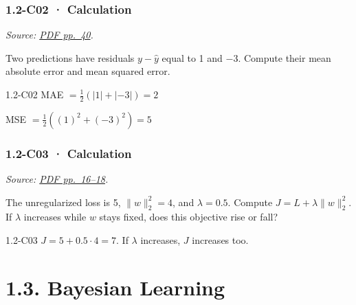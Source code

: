 \noindent\begin{minipage}{\linewidth}

\subsubsection{1.2-C02 · Calculation}\label{c02-calculation-1}

\emph{Source:
\href{../Lecture\%20Slides/1.2.\%20Shallow\%20Learning.pdf\#page=40}{PDF
pp.~40}.}

Two predictions have residuals \(y-\hat y\) equal to 1 and \(-3\).
Compute their mean absolute error and mean squared error.

\begin{solution}[26mm]{1.2-C02}
MAE $= \frac{1}{2}(|1| + |-3|) = 2$

MSE $= \frac{1}{2}((1)^2 + (-3)^2) = 5$
\end{solution}
\end{minipage}\par\medskip

\noindent\begin{minipage}{\linewidth}

\subsubsection{1.2-C03 · Calculation}\label{c03-calculation-1}

\emph{Source:
\href{../Lecture\%20Slides/1.2.\%20Shallow\%20Learning.pdf\#page=16}{PDF
pp.~16--18}.}

The unregularized loss is 5, \(\|w\|_2^2=4\), and \(\lambda=0.5\).
Compute \(J=L+\lambda\|w\|_2^2\). If \(\lambda\) increases while \(w\)
stays fixed, does this objective rise or fall?

\begin{solution}[26mm]{1.2-C03}
$J = 5 + 0.5\cdot 4 = 7$. If $\lambda$ increases, $J$ increases too.
\end{solution}
\end{minipage}\par\medskip

\clearpage

\section{1.3. Bayesian Learning}\label{bayesian-learning}

